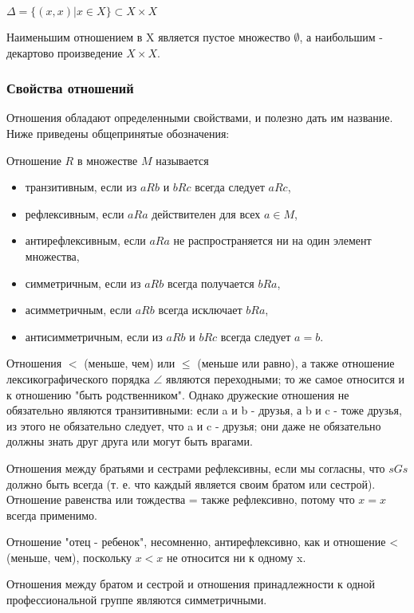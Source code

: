 \vspace{0.5cm}
\(\Delta = \{(x,x)|x \in X\} \subset X \times X\)

\vspace{0.5cm}

Наименьшим отношением в X является пустое множество \(\emptyset\), а наибольшим - декартово произведение \(X \times X\).

\subsubsection{Свойства отношений}
Отношения обладают определенными свойствами, и полезно дать им название. Ниже приведены общепринятые обозначения:

Отношение \(R\) в множестве \(M\) называется
\begin{itemize}
  \item транзитивным, если из \(aRb\) и \(bRc\) всегда следует \(aRc\),
  \item рефлексивным, если \(aRa\) действителен для всех \(a \in M\),
  \item антирефлексивным, если \(aRa\) не распространяется ни на один элемент множества,
  \item симметричным, если из \(aRb\) всегда получается \(bRa\),
  \item асимметричным, если \(aRb\) всегда исключает \(bRa\),
  \item антисимметричным, если из \(aRb\) и \(bRc\) всегда следует \(a=b\).
\end{itemize}

Отношения \(<\) (меньше, чем) или \(\leq\) (меньше или равно), а также отношение лексикографического порядка \(\angle\) являются переходными;
то же самое относится и к отношению "быть родственником".
Однако дружеские отношения не обязательно являются транзитивными: если a и b - друзья, а b и c - тоже друзья, из этого не обязательно следует, что a и c - друзья;
они даже не обязательно должны знать друг друга или могут быть врагами.

Отношения между братьями и сестрами рефлексивны, если мы согласны, что \(sGs\) должно быть всегда (т. е.
что каждый является своим братом или сестрой). Отношение равенства или тождества = также рефлексивно, потому что \(x=x\) всегда применимо.

Отношение "отец - ребенок", несомненно, антирефлексивно, как и отношение < (меньше, чем), поскольку \(x < x\) не относится ни к одному x.

Отношения между братом и сестрой и отношения принадлежности к одной профессиональной группе являются симметричными.

